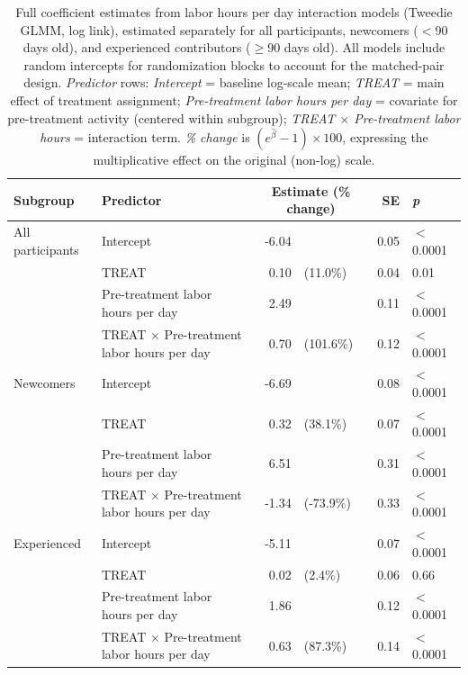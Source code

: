 \begin{table}[ht]
\centering
\small
\caption{Full coefficient estimates from labor hours per day interaction models (Tweedie GLMM, log link), estimated separately for all participants, newcomers ($<$90 days old), and experienced contributors ($\geq$90 days old). All models include random intercepts for randomization blocks to account for the matched-pair design. \textit{Predictor} rows: \textit{Intercept} = baseline log-scale mean; \textit{TREAT} = main effect of treatment assignment; \textit{Pre-treatment labor hours per day} = covariate for pre-treatment activity (centered within subgroup); \textit{TREAT $\times$ Pre-treatment labor hours} = interaction term. \textit{\% change} is $(e^{\hat{\beta}} - 1) \times 100$, expressing the multiplicative effect on the original (non-log) scale.}
\label{table:full_labor_perday}
\begin{tabular}{llr@{\hskip 0.5em}lrl}
\toprule
\textbf{Subgroup} & \textbf{Predictor} & \multicolumn{2}{c}{\textbf{Estimate (\% change)}} & \textbf{SE} & \textbf{\textit{p}} \\
\midrule
All participants & Intercept & -6.04 &  & 0.05 & $<$0.0001 \\
 & TREAT & 0.10 & (11.0\%) & 0.04 & 0.01 \\
 & Pre-treatment labor hours per day & 2.49 &  & 0.11 & $<$0.0001 \\
 & TREAT $\times$ Pre-treatment labor hours per day & 0.70 & (101.6\%) & 0.12 & $<$0.0001 \\
\addlinespace
Newcomers & Intercept & -6.69 &  & 0.08 & $<$0.0001 \\
 & TREAT & 0.32 & (38.1\%) & 0.07 & $<$0.0001 \\
 & Pre-treatment labor hours per day & 6.51 &  & 0.31 & $<$0.0001 \\
 & TREAT $\times$ Pre-treatment labor hours per day & -1.34 & (-73.9\%) & 0.33 & $<$0.0001 \\
\addlinespace
Experienced & Intercept & -5.11 &  & 0.07 & $<$0.0001 \\
 & TREAT & 0.02 & (2.4\%) & 0.06 & 0.66 \\
 & Pre-treatment labor hours per day & 1.86 &  & 0.12 & $<$0.0001 \\
 & TREAT $\times$ Pre-treatment labor hours per day & 0.63 & (87.3\%) & 0.14 & $<$0.0001 \\
\bottomrule
\end{tabular}
\end{table}
